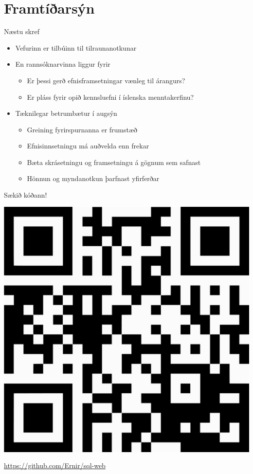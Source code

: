 \documentclass{beamer}
\begin{document}
\section{Framtíðarsýn}

\begin{frame}{Næstu skref}
    \begin{itemize}
        \item Vefurinn er tilbúinn til tilraunanotkunar
        \item En rannsóknarvinna liggur fyrir
        \begin{itemize}
            \item Er þessi gerð efnisframsetningar vænleg til árangurs?
            \item Er pláss fyrir opið kennsluefni í íslenska menntakerfinu?
        \end{itemize}
        \item Tæknilegar betrumbætur í augsýn
        \begin{itemize}
            \item Greining fyrirspurnanna er frumstæð
            \item Efnisinnsetningu má auðvelda enn frekar
            \item Bæta skrásetningu og framsetningu á gögnum sem safnast
            \item Hönnun og myndanotkun þarfnast yfirferðar
        \end{itemize}
    \end{itemize}
\end{frame}

\begin{frame}{Sækið kóðann!}
    \begin{center}
        \includegraphics[height=0.65\textheight]{qr-code}

        \url{https://github.com/Ernir/sql-web}
    \end{center}
\end{frame}
\end{document}
